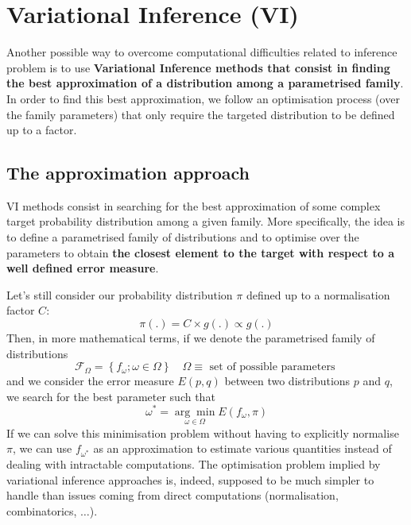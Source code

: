 \section{Variational Inference (VI)}

Another possible way to overcome computational difficulties related to inference problem is to use \textbf{Variational Inference methods that consist in finding the best approximation of a distribution among a parametrised family}. In order to find this best approximation, we follow an optimisation process (over the family parameters) that only require the targeted distribution to be defined up to a factor.

\subsection{The approximation approach}

VI methods consist in searching for the best approximation of some complex target probability distribution among a given family. More specifically, the idea is to define a parametrised family of distributions and to optimise over the parameters to obtain \textbf{the closest element to the target with respect to a well defined error measure}.

Let's still consider our probability distribution $\pi$ defined up to a normalisation factor $C$:
\begin{equation}\pi(.)=C \times g(.) \propto g(.)\end{equation}
Then, in more mathematical terms, if we denote the parametrised family of distributions
\begin{equation}\mathcal{F}_{\Omega}=\left\{f_{\omega} ; \omega \in \Omega\right\} \quad \Omega \equiv \text { set of possible parameters }\end{equation}
and we consider the error measure $E(p,q)$ between two distributions $p$ and $q$, we search for the best parameter such that
\begin{equation}\omega^{*}=\underset{\omega \in \Omega}{\arg \min } E\left(f_{\omega}, \pi\right)\end{equation}
If we can solve this minimisation problem without having to explicitly normalise $\pi$, we can use $f_{\omega^*}$ as an approximation to estimate various quantities instead of dealing with intractable computations. The optimisation problem implied by variational inference approaches is, indeed, supposed to be much simpler to handle than issues coming from direct computations (normalisation, combinatorics, $\ldots$).


